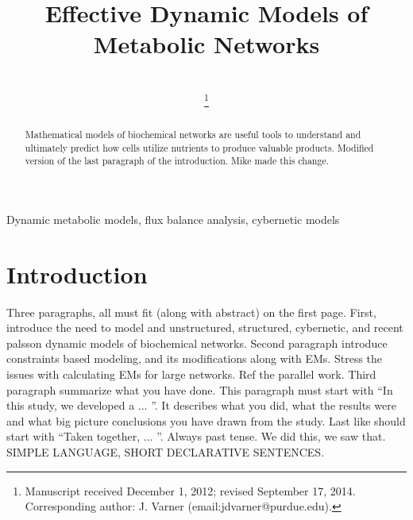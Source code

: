 \documentclass[10pt,twocolumn,twoside,final]{IEEEtran}
\begin{document}
\title{Effective Dynamic Models of Metabolic Networks}


\author{\\
\thanks{Manuscript received December 1, 2012; revised September 17, 2014.
Corresponding author: J. Varner (email:jdvarner@purdue.edu).}}

\maketitle

\begin{abstract}
Mathematical models of biochemical networks are useful tools to understand and ultimately predict how cells utilize nutrients to produce valuable products.
Modified version of the last paragraph of the introduction. Mike made this change.

\end{abstract}


\begin{IEEEkeywords}
Dynamic metabolic models, flux balance analysis, cybernetic models
\end{IEEEkeywords}

\section{Introduction}
Three paragraphs, all must fit (along with abstract) on the first page.
First, introduce the need to model and unstructured, structured, cybernetic, and recent palsson dynamic models of biochemical networks.
Second paragraph introduce constraints based modeling, and its modifications along with EMs. Stress the issues with calculating EMs for large networks. Ref the parallel work.
Third paragraph summarize what you have done. This paragraph must start with ``In this study, we developed a ... ''. It describes what you did, what the results were and what big picture conclusions you have drawn from the study. Last like should start with ``Taken together, ... ''. Always past tense. We did this, we saw that. SIMPLE LANGUAGE, SHORT DECLARATIVE SENTENCES.
\end{document}
